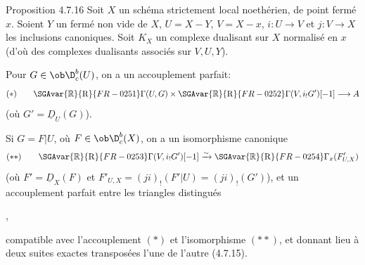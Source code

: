 \begin{statement}{Proposition 4.7.16}
Soit $X$ un schéma strictement local noethérien, de point fermé $x$. Soient $Y$ un fermé non vide de $X$, $U=X-Y$, $V=X-x$, $i:U\to V$ et $j:V\to X$ les inclusions canoniques. Soit $K_X$ un complexe dualisant sur $X$ normalisé en $x$ (d'où des complexes dualisants associés sur $V,U,Y$).

Pour $G\in\ob\D_c^b(U)$, on a un accouplement parfait:
\[
(*)\qquad \SGAvar{\mathbb{R}}{\mathrm{R}}{FR-0251}\Gamma(U,G)\times\SGAvar{\mathbb{R}}{\mathrm{R}}{FR-0252}\Gamma(V,i_!G')[-1]\longrightarrow A
\]
(où $G'=\underline{D}_U(G)$).

Si $G=F|U$, où $F\in\ob\D_c^b(X)$, on a un isomorphisme canonique
\[
(**)\qquad \SGAvar{\mathbb{R}}{\mathrm{R}}{FR-0253}\Gamma(V,i_!G')[-1]\xrightarrow{\sim}\SGAvar{\mathbb{R}}{\mathrm{R}}{FR-0254}\Gamma_x(F'_{U,X})
\]
(où $F'=\underline{D}_X(F)$ et $F'_{U,X}=(ji)_!(F'|U)=(ji)_!(G')$), et un accouplement parfait entre les triangles distingués
\begin{center}
\quad ,
\end{center}
compatible avec l'accouplement $(*)$ et l'isomorphisme $(**)$, et donnant lieu à deux suites exactes transposées l'une de l'autre (4.7.15).
\end{statement}


